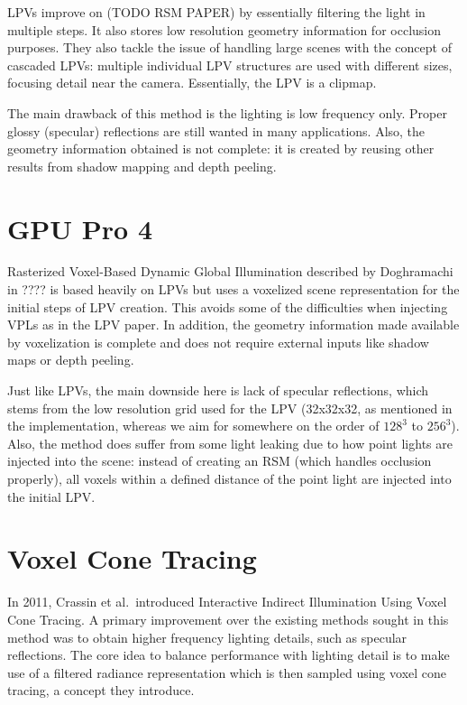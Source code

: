 LPVs improve on (TODO RSM PAPER) by essentially filtering the light in multiple steps. It also stores low resolution geometry information for occlusion purposes. They also tackle the issue of handling large scenes with the concept of cascaded LPVs: multiple individual LPV structures are used with different sizes, focusing detail near the camera. Essentially, the LPV is a clipmap.

The main drawback of this method is the lighting is low frequency only. Proper glossy (specular) reflections are still wanted in many applications. Also, the geometry information obtained is not complete: it is created by reusing other results from shadow mapping and depth peeling.

\section{GPU Pro 4}
Rasterized Voxel-Based Dynamic Global Illumination described by Doghramachi in ???? is based heavily on LPVs but uses a voxelized scene representation for the initial steps of LPV creation. This avoids some of the difficulties when injecting VPLs as in the LPV paper. In addition, the geometry information made available by voxelization is complete and does not require external inputs like shadow maps or depth peeling.

Just like LPVs, the main downside here is lack of specular reflections, which stems from the low resolution grid used for the LPV (32x32x32, as mentioned in the implementation, whereas we aim for somewhere on the order of $128^3$ to $256^3$). Also, the method does suffer from some light leaking due to how point lights are injected into the scene: instead of creating an RSM (which handles occlusion properly), all voxels within a defined distance of the point light are injected into the initial LPV.

\section{Voxel Cone Tracing}
In 2011, Crassin et al.\ introduced Interactive Indirect Illumination Using Voxel Cone Tracing. A primary improvement over the existing methods sought in this method was to obtain higher frequency lighting details, such as specular reflections. The core idea to balance performance  with lighting detail is to make use of a filtered radiance representation which is then sampled using voxel cone tracing, a concept they introduce.

